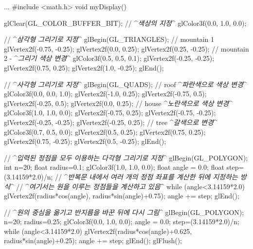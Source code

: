 ...
#include <math.h>
void myDisplay() {
    glClear(GL_COLOR_BUFFER_BIT);
    // ^{\it 색상의 지정}^
    glColor3f(0.0, 1.0, 0.0);    

    // ^{\it 삼각형 그리기로 지정}^
    glBegin(GL_TRIANGLES);
    // mountain 1
    glVertex2f(-0.75, -0.25);
    glVertex2f(0.0, 0.25);
    glVertex2f(0.25, -0.25);
    // mountain 2 - ^{\it 그리기 색상 변경}^
    glColor3f(0.5, 0.5, 0.1);
    glVertex2f(-0.25, -0.25);
    glVertex2f(0.75, 0.25);
    glVertex2f(1.0, -0.25);
    glEnd();

    // ^{\it 사각형 그리기로 지정}^
    glBegin(GL_QUADS);
    // roof ^{\it 파란색으로 색상 변경}^
    glColor3f(0.0, 0.0, 1.0);
    glVertex2f(-1.0, 0.25);
    glVertex2f(-0.75, 0.5);
    glVertex2f(-0.25, 0.5);
    glVertex2f(0.0, 0.25);
    // house ^{\it 노란색으로 색상 변경}^
    glColor3f(1.0, 1.0, 0.0);
    glVertex2f(-0.75, 0.25);
    glVertex2f(-0.75, -0.25);
    glVertex2f(-0.25, -0.25);
    glVertex2f(-0.25, 0.25);
    // tree ^{\it 갈색으로 변경}^
    glColor3f(0.7, 0.5, 0.0);
    glVertex2f(0.5, 0.25);
    glVertex2f(0.75, 0.25);
    glVertex2f(0.75, -0.25);
    glVertex2f(0.5, -0.25);
    glEnd();

    // ^{\it 입력된 정점을 모두 이용하는 다각형 그리기로 지정}^
    glBegin(GL_POLYGON);
    int n=20;
    float radius=0.1;
    glColor3f(1.0, 1.0, 0.0);
    float angle = 0.0; float step=(3.14159*2.0)/n;
    // ^{\it 반복문 내에서 여러 개의 정점 좌표를 계산한 뒤에 지정하는 방식}^
    // ^{\it 여기서는 원을 이루는 정점들을 계산하고 있음}^
    while (angle<3.14159*2.0) {
        glVertex2f(radius*cos(angle), radius*sin(angle)+0.75);
        angle += step;
    }
    glEnd();

    // ^{\it 원의 중심을 옮기고 반지름을 바꾼 뒤에 다시 그림}^
    glBegin(GL_POLYGON);
    n=20;
    radius=0.25;
    glColor3f(0.0, 1.0, 0.0);
    angle = 0.0; step=(3.14159*2.0)/n;
    while (angle<3.14159*2.0) {
        glVertex2f(radius*cos(angle)+0.625, radius*sin(angle)+0.25);
        angle += step;
    } 
    glEnd();
    glFlush();
}